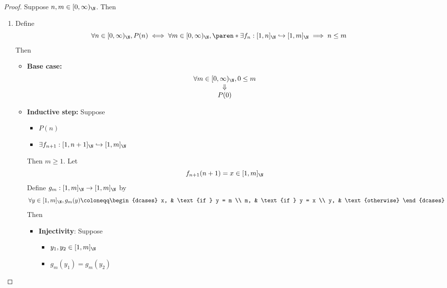 \begin{proof}
  Suppose $n, m \in [0, \infty)_{\N}$. Then
  \begin{enumerate}[label=\textbf{(\Alph*)}]
    \item Define
          \[
            \forall n \in [0, \infty)_{\N}, P(n) \iff \forall m \in [0, \infty)_{\N}, \paren*{\exists f_{n}:
              [1, n]_{\N} \hookrightarrow [1, m]_{\N}} \implies n \leq m
          \]
          Then
          \begin{itemize}
            \item \textbf{Base case:}
                  \[
                    \begin{array}{c}
                      \forall m \in [0, \infty)_{\N}, 0 \leq m \\
                      \Downarrow                               \\
                      P(0)
                    \end{array}
                  \]
            \item \textbf{Inductive step:} Suppose
                  \begin{itemize}
                    \item $P(n)$
                    \item $\exists f_{n + 1}: [1, n + 1]_{\N} \hookrightarrow [1, m]_{\N}$
                  \end{itemize}
                  Then $m \geq 1$. Let
                  \[
                    f_{n + 1}(n + 1) = x \in [1, m]_{\N}
                  \]
                  Define $g_{m}: [1, m]_{\N} \to [1, m]_{\N}$ by
                  \[
                    \forall y \in [1, m]_{\N}, g_{m}(y) \coloneqq \begin{dcases}
                      x, & \text{if } y = m \\
                      m, & \text{if } y = x \\
                      y, & \text{otherwise}
                    \end{dcases}
                  \]
                  Then
                  \begin{itemize}
                    \item \textbf{Injectivity}: Suppose
                          \begin{itemize}
                            \item $y_{1}, y_{2} \in [1, m]_{\N}$
                            \item $g_{m}(y_{1}) = g_{m}(y_{2})$

\end{itemize}
\end{itemize}
\end{itemize}
\end{enumerate}
\end{proof}
